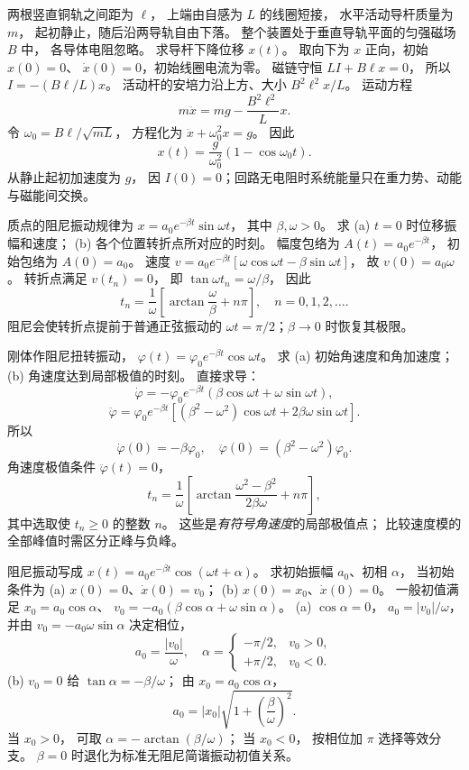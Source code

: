 两根竖直铜轨之间距为 $\ell$，
上端由自感为 $L$ 的线圈短接，
水平活动导杆质量为 $m$，
起初静止，随后沿两导轨自由下落。
整个装置处于垂直导轨平面的匀强磁场 $B$ 中，
各导体电阻忽略。
求导杆下降位移 $x(t)$。
\exsolution
取向下为 $x$ 正向，初始 $x(0)=0$、
$\dot x(0)=0$，初始线圈电流为零。
磁链守恒
$LI+B\ell x=0$，
所以 $I=-(B\ell/L)x$。
活动杆的安培力沿上方、大小
$B^2\ell^2x/L$。
运动方程
\[
m\ddot x=mg-\frac{B^2\ell^2}{L}x.
\]
令
$\omega_0=B\ell/\sqrt{mL}$，
方程化为
$\ddot x+\omega_0^2x=g$。
因此
\[
\boxed{x(t)=\frac{g}{\omega_0^2}
(1-\cos\omega_0t)}.
\]
\excheck 从静止起初加速度为 $g$，
因 $I(0)=0$；回路无电阻时系统能量只在重力势、动能与磁能间交换。

质点的阻尼振动规律为
$x=a_0e^{-\beta t}\sin\omega t$，
其中 $\beta,\omega>0$。
求 (a) $t=0$ 时位移振幅和速度；
(b) 各个位置转折点所对应的时刻。
\exsolution
幅度包络为
$A(t)=a_0e^{-\beta t}$，
初始包络为
$\boxed{A(0)=a_0}$。
速度
$v=a_0e^{-\beta t}[\omega\cos\omega t-
\beta\sin\omega t]$，
故
$\boxed{v(0)=a_0\omega}$。
转折点满足 $v(t_n)=0$，
即
$\tan\omega t_n=\omega/\beta$，
因此
\[
\boxed{t_n=\frac1\omega
\left[\arctan\frac{\omega}{\beta}+n\pi\right],
\quad n=0,1,2,\ldots}.
\]
\excheck 阻尼会使转折点提前于普通正弦振动的
$\omega t=\pi/2$；$\beta\to0$ 时恢复其极限。

刚体作阻尼扭转振动，
$\varphi(t)=\varphi_0e^{-\beta t}\cos\omega t$。
求 (a) 初始角速度和角加速度；
(b) 角速度达到局部极值的时刻。
\exsolution
直接求导：
\[
\dot\varphi=-\varphi_0e^{-\beta t}
(\beta\cos\omega t+\omega\sin\omega t),
\]
\[
\ddot\varphi=\varphi_0e^{-\beta t}
[(\beta^2-\omega^2)\cos\omega t+
2\beta\omega\sin\omega t].
\]
所以
\[
\boxed{\dot\varphi(0)=-\beta\varphi_0},
\quad
\boxed{\ddot\varphi(0)=(\beta^2-\omega^2)\varphi_0}.
\]
角速度极值条件 $\ddot\varphi(t)=0$，
\[
\boxed{t_n=\frac1\omega
\left[\arctan\frac{\omega^2-\beta^2}{2\beta\omega}
+n\pi\right]},
\]
其中选取使 $t_n\ge0$ 的整数 $n$。
\excheck 这些是\emph{有符号角速度}的局部极值点；
比较速度模的全部峰值时需区分正峰与负峰。

阻尼振动写成
$x(t)=a_0e^{-\beta t}\cos(\omega t+\alpha)$。
求初始振幅 $a_0$、初相 $\alpha$，
当初始条件为
(a) $x(0)=0$、$\dot x(0)=v_0$；
(b) $x(0)=x_0$、$\dot x(0)=0$。
\exsolution
一般初值满足
$x_0=a_0\cos\alpha$、
$v_0=-a_0(\beta\cos\alpha+\omega\sin\alpha)$。
(a) $\cos\alpha=0$，
$a_0=|v_0|/\omega$，
并由 $v_0=-a_0\omega\sin\alpha$ 决定相位，
\[
\boxed{a_0=\frac{|v_0|}{\omega},
\quad
\alpha=
\begin{cases}
-\pi/2,&v_0>0,\\
+\pi/2,&v_0<0.
\end{cases}}
\]
(b) $v_0=0$ 给
$\tan\alpha=-\beta/\omega$；
由 $x_0=a_0\cos\alpha$，
\[
\boxed{a_0=|x_0|
\sqrt{1+\left(\frac\beta\omega\right)^2}}.
\]
当 $x_0>0$，
可取
$\alpha=-\arctan(\beta/\omega)$；
当 $x_0<0$，
按相位加 $\pi$ 选择等效分支。
\excheck $\beta=0$ 时退化为标准无阻尼简谐振动初值关系。

